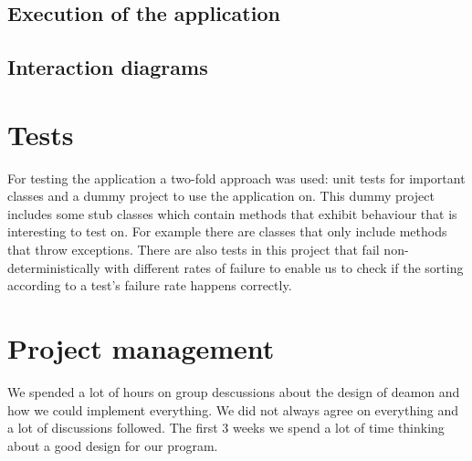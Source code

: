 \documentclass[i2]{oss}
\begin{document}
\subsection{Execution of the application}


\subsection{Interaction diagrams}
\label{ssec:Interactiedia}




\section{Tests}
\label{ssec:tests}

For testing the application a two-fold approach was used: unit tests for
important classes and a dummy project to use the application on.
This dummy project includes some stub classes which contain methods that
exhibit behaviour that is interesting to test on.
For example there are classes that only include methods that throw 
exceptions.
There are also tests in this project that fail non-deterministically with 
different rates of failure to enable us to check if the sorting according 
to a test's failure rate happens correctly.



\section{Project management}
\label{ssec:Projectmanag}

We spended a lot of hours on group descussions about the design of deamon and how we could implement everything. We did not always agree on everything and a lot of discussions followed. The first 3 weeks we spend a lot of time thinking about a good design for our program.\\ 
\end{document}

